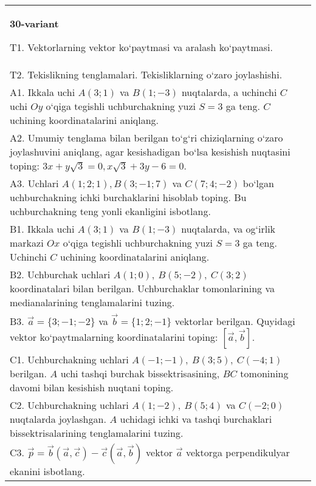 \documentclass{article}
\begin{document}
\begin{tabular}{m{17cm}}
\textbf{30-variant}
\newline

T1. 
Vektorlarning vektor ko‘paytmasi va aralash ko‘paytmasi.
 \\
T2. 
Tekislikning tenglamalari. Tekisliklarning o‘zaro joylashishi.
 \\
A1. 
Ikkala uchi $A (3;1) $ va $B (1;-3) $ nuqtalarda, a
uchinchi $C$ uchi $Oy$ o‘qiga tegishli uchburchakning
yuzi $S=3$ ga teng. $C$ uchining koordinatalarini aniqlang.
 \\
A2. 
Umumiy tenglama bilan berilgan to‘g‘ri chiziqlarning
o‘zaro joylashuvini aniqlang, agar kesishadigan bo‘lsa kesishish nuqtasini
toping: $3x+y\sqrt{3}=0, x\sqrt{3}+3y-6=0$.
 \\
A3. 
Uchlari $A (1;2;1), B (3;-1;7) $ va $C (7;4;-2) $ bo‘lgan uchburchakning
ichki burchaklarini hisoblab toping. Bu uchburchakning teng yonli ekanligini isbotlang.
 \\
B1. 
Ikkala uchi \(A (3;1) \) va \(B (1;-3) \) nuqtalarda, va
og‘irlik markazi $Ox$ o‘qiga tegishli uchburchakning yuzi
\(S=3\) ga teng. Uchinchi $C$ uchining koordinatalarini aniqlang. \\
B2. 
Uchburchak uchlari \(A (1;0),\ B (5;-2),\ C (3;2) \)
koordinatalari bilan berilgan. Uchburchaklar tomonlarining va
medianalarining tenglamalarini tuzing.
 \\
B3. 
$\vec{a} = \{ 3; - 1; - 2\}$ va $\vec{b} = \{ 1;2; - 1\}$ vektorlar berilgan. Quyidagi vektor ko‘paytmalarning koordinatalarini toping:
$\left\lbrack \vec{a},\vec{b} \right\rbrack$.
 \\
C1. 
Uchburchakning uchlari
\(A (- 1; - 1),\ B (3;5),\ C (- 4;1) \) berilgan. $A$ uchi tashqi
burchak bissektrisasining, $BC$ tomonining davomi bilan kesishish
nuqtani toping.
 \\
C2. 
Uchburchakning uchlari \(A (1;-2),\ B (5; 4) \) va
\(C (-2;0) \) nuqtalarda joylashgan. $A$ uchidagi ichki va tashqi
burchaklari bissektrisalarining tenglamalarini tuzing.
 \\
C3. 
\(\vec{p} = \vec{b} (\vec{a},\vec{c}) - \vec{c} (\vec{a},\vec{b}) \) vektor \(\vec{a}\) vektorga perpendikulyar ekanini isbotlang.
 \\

\end{tabular}
\vspace{1cm}
\end{document}
